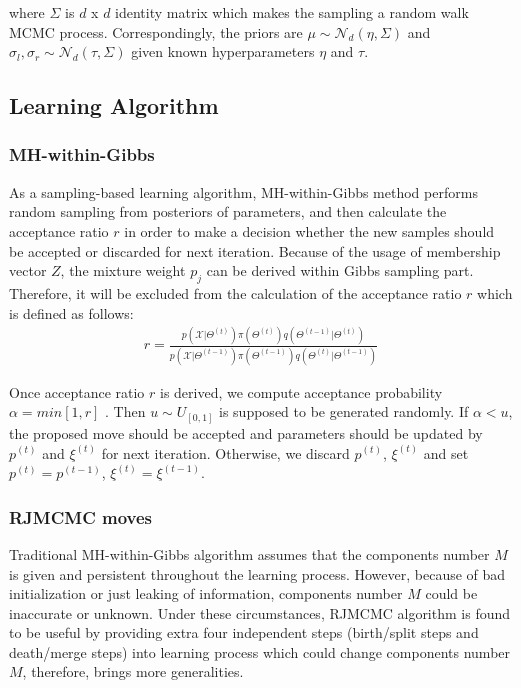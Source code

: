 \documentclass[conference]{IEEEtran}
\begin{document}
where $\Sigma$ is $d$ x $d$ identity matrix which makes the sampling a random walk MCMC process. Correspondingly, the priors are $\mu \sim \mathcal{N}_d(\eta,\Sigma)$ and $\sigma_l, \sigma_r \sim \mathcal{N}_d(\tau,\Sigma)$ given known hyperparameters $\eta$ and $\tau$.

\subsection{Learning Algorithm}
\subsubsection*{MH-within-Gibbs}
As a sampling-based learning algorithm, MH-within-Gibbs method performs random sampling from posteriors of parameters, and then calculate the acceptance ratio $r$ in order to make a decision whether the new samples should be accepted or discarded for next iteration. Because of the usage of membership vector $Z$, the mixture weight $p_j$ can be derived within Gibbs sampling part. Therefore, it will be excluded from the calculation of the acceptance ratio $r$ which is defined as follows:
\begin{align}
r = \frac{p(\mathcal{X}|\Theta^{(t)})\pi(\Theta^{(t)})q(\Theta^{(t-1)}|\Theta^{(t)})}{p(\mathcal{X}|\Theta^{(t-1)})\pi(\Theta^{(t-1)})q(\Theta^{(t)}|\Theta^{(t-1)})}
\label{eq:r}
\end{align}

Once acceptance ratio $r$ is derived, we compute acceptance probability $\alpha = min[1,r]$ \cite{b11}. Then $u \sim U_{[0,1]}$ is supposed to be generated randomly. If $\alpha < u$, the proposed move should be accepted and parameters should be updated by $p^{(t)}$ and $\xi^{(t)}$ for next iteration. Otherwise, we discard $p^{(t)}$, $\xi^{(t)}$ and set $p^{(t)} = p^{(t-1)}$, $\xi^{(t)} = \xi^{(t-1)}$. 
\bigskip

\subsubsection*{RJMCMC moves}
Traditional MH-within-Gibbs algorithm assumes that the components number $M$ is given and persistent throughout the learning process. However, because of bad initialization or just leaking of information, components number $M$ could be inaccurate or unknown. Under these circumstances, RJMCMC algorithm is found to be useful by providing extra four independent steps (birth/split steps and death/merge steps) into learning process which could change components number $M$, therefore, brings more generalities.
\end{document}
